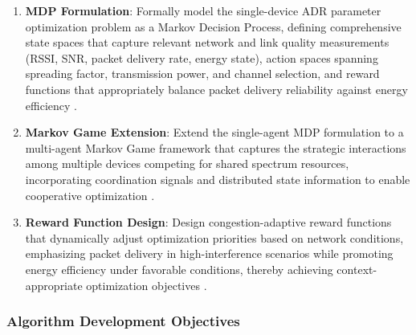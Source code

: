 \documentclass[12pt,a4paper]{article}
\begin{document}
\begin{enumerate}
    \item \textbf{MDP Formulation}: Formally model the single-device ADR parameter optimization problem as a Markov Decision Process, defining comprehensive state spaces that capture relevant network and link quality measurements (RSSI, SNR, packet delivery rate, energy state), action spaces spanning spreading factor, transmission power, and channel selection, and reward functions that appropriately balance packet delivery reliability against energy efficiency \cite{sutton2018reinforcement}.
    
    \item \textbf{Markov Game Extension}: Extend the single-agent MDP formulation to a multi-agent Markov Game framework that captures the strategic interactions among multiple devices competing for shared spectrum resources, incorporating coordination signals and distributed state information to enable cooperative optimization \cite{littman1994markov}.
    
    \item \textbf{Reward Function Design}: Design congestion-adaptive reward functions that dynamically adjust optimization priorities based on network conditions, emphasizing packet delivery in high-interference scenarios while promoting energy efficiency under favorable conditions, thereby achieving context-appropriate optimization objectives \cite{gronauer2022multi}.
\end{enumerate}

\subsubsection{Algorithm Development Objectives}
\end{document}
